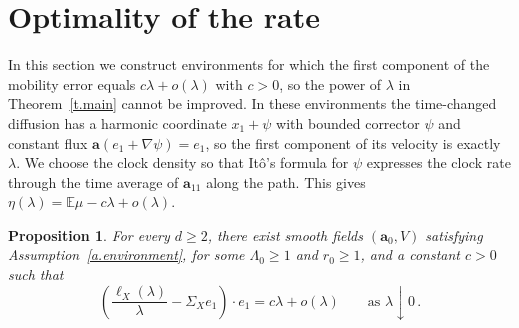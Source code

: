 \documentclass[11pt]{amsart}
\newtheorem{proposition}{Proposition}[section]
\theoremstyle{definition}
\theoremstyle{remark}
\numberwithin{equation}{section}
\newcommand{\E}{\mathbb E}
\renewcommand{\a}{\mathbf a}
\begin{document}
\section{Optimality of the rate}\label{sec.sharpness}

In this section we construct environments for which the first component of the mobility error equals $c\lambda+o(\lambda)$ with $c>0$, so the power of $\lambda$ in Theorem~\ref{t.main} cannot be improved. In these environments the time-changed diffusion has a harmonic coordinate $x_1+\psi$ with bounded corrector $\psi$ and constant flux $\a(e_1+\nabla\psi)=e_1$, so the first component of its velocity is exactly $\lambda$. We choose the clock density so that It\^o's formula for $\psi$ expresses the clock rate through the time average of $\a_{11}$ along the path. This gives $\eta(\lambda)=\E\mu-c\lambda+o(\lambda)$.

\begin{proposition}\label{sharp.example}
For every $d\geq2$, there exist smooth fields $(\a_0,V)$ satisfying Assumption~\ref{a.environment}, for some $\Lambda_0\geq1$ and $r_0\geq1$, and a constant $c>0$ such that
\begin{equation}\label{eq.sharp-expansion}
 \left(\frac{\ell_X(\lambda)}{\lambda}-\Sigma_Xe_1\right)\cdot e_1
 =c\lambda+o(\lambda)
 \qquad\text{as }\lambda\downarrow0\, .
\end{equation}
\end{proposition}
\end{document}
